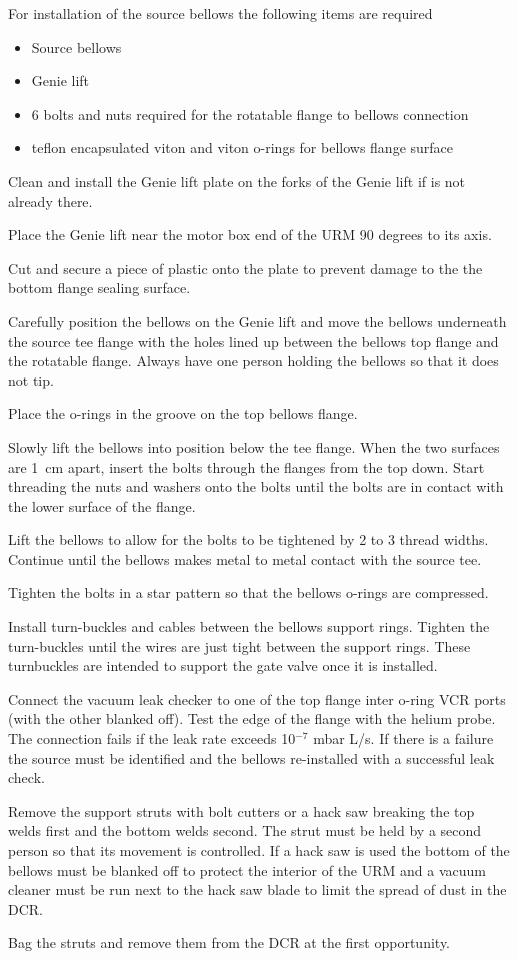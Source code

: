 \documentclass[11pt]{article}
\begin{document}
For installation of the source bellows the following items are required
\begin{itemize}[label=$\square$]
\item Source bellows
\item Genie lift
\item 6 bolts and nuts required for the rotatable flange to bellows connection
\item teflon encapsulated viton and viton o-rings for bellows flange surface
\end{itemize}
\begin{answerlist}
\item Clean and install the Genie lift plate on the forks of the Genie lift if is not already there.
\item Place the Genie lift near the motor box end of the URM 90 degrees to its axis.
\item Cut and secure a piece of plastic onto the plate to prevent damage to the the bottom flange sealing surface.
\item Carefully position the bellows on the Genie lift and move the bellows underneath the source tee flange with the holes lined up between the bellows top flange and the rotatable flange. Always have one person holding the bellows so that it does not tip.
\item Place the o-rings in the groove on the top bellows flange.
\item  Slowly lift the bellows into position below the tee flange. When the two surfaces are 1~cm apart, insert the bolts through the flanges from the top down. Start threading the nuts and washers onto the bolts until the bolts are in contact with the lower surface of the flange.
\item Lift the bellows to allow for the bolts to be tightened by 2 to 3 thread widths. Continue until the bellows makes metal to metal contact with the source tee.
\item Tighten the bolts in a star pattern so that the bellows o-rings are compressed.
\item Install turn-buckles and cables between the bellows support
  rings. Tighten the turn-buckles until the wires are just tight
  between the support rings. These turnbuckles are intended to support
  the gate valve once it is installed.
 \item Connect the vacuum leak checker to one of the top flange inter
  o-ring VCR ports (with the other blanked off). Test the edge of the
  flange with the helium probe. The connection fails if the leak rate
  exceeds 10$^{-7}$ mbar L/s. If there is a failure the source must be
  identified and the bellows re-installed with a successful leak
  check.
\item Remove the support struts with bolt cutters or a hack saw
  breaking the top welds first and the bottom welds second. The strut
  must be held by a second person so that its movement is
  controlled. If a hack saw is used the bottom of the bellows must be
  blanked off to protect the interior of the URM and a vacuum cleaner
  must be run next to the hack saw blade to limit the spread of dust
  in the DCR.
\item Bag the struts and remove them from the DCR at the first opportunity.
\end{answerlist}
\end{document}
